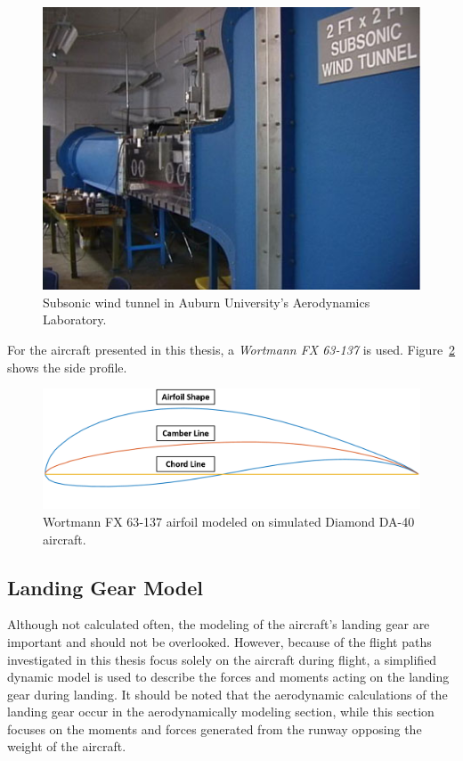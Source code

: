 \documentclass[12pt]{report}
\begin{document}
\begin{figure}[!ht]\label{fig:windtunnel}
  \centering
  \includegraphics[width=.75\linewidth]{Figures/opencircuitwindtunnel.jpg}
  \caption{Subsonic wind tunnel in Auburn University's Aerodynamics Laboratory.}
\end{figure}

For the aircraft presented in this thesis, a \textit{Wortmann FX 63{-}137} is used. Figure~\ref{fig:airfoil} shows the side profile.

\begin{figure}[!ht]\label{fig:airfoil}
  \centering
  \includegraphics[width=\linewidth]{Figures/da40airfoil.png}
  \caption{Wortmann FX 63{-}137 airfoil modeled on simulated Diamond DA-40 aircraft.}
\end{figure}
\clearpage
\subsection{Landing Gear Model}
Although not calculated often, the modeling of the aircraft's landing gear are important and should not be overlooked. However, because of the flight paths investigated in this thesis focus solely on the aircraft during flight, a simplified dynamic model is used to describe the forces and moments acting on the landing gear during landing. It should be noted that the aerodynamic calculations of the landing gear occur in the aerodynamically modeling section, while this section focuses on the moments and forces generated from the runway opposing the weight of the aircraft.
\end{document}
